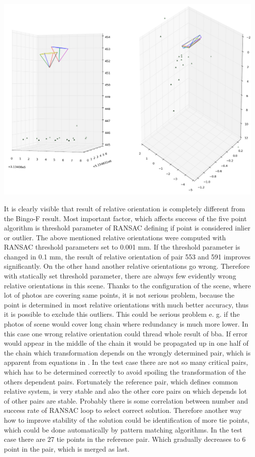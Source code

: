 \documentclass[a4paper,12pt]{article}
\begin{document}
\includegraphics[scale=0.4]{figures/rel_or_553_591.png}

It is clearly visible that result of relative orientation is completely different from the Bingo-F result.
Most important factor, which affects success of the five point algorithm is threshold parameter of RANSAC defining 
if point is considered inlier or outlier.
The above mentioned relative orientations were computed with RANSAC threshold parameters set to 0.001 mm.
If the threshold parameter is changed in 0.1 mm, the result of relative orientation of pair 553 and 591 improves significantly.
On the other hand another relative orientations go wrong. Therefore with statically set threshold parameter, there are always 
few evidently wrong relative orientations in this scene. Thanks to the configuration of the scene, where lot of photos are 
covering same points, it is  not serious problem, because the point is determined in most relative orientations  with 
much better accuracy, thus it is possible to exclude this outliers. This could be serious problem e. g. if the photos 
of scene would cover long chain where redundancy is much more lower.   
In this case one wrong relative orientation could thread whole result of bba. If error would appear in the middle 
of the chain it would  be propagated up in one half of the chain which transformation depends on the wrongly
determined pair, which is apparent from equations in \label{eq:comm_rel}. 
In the test case there are not so many critical pairs, which has to be determined correctly to avoid spoiling the transformation 
of the others dependent pairs. Fortunately the reference pair, which defines common relative system, is very stable and also 
the other  core pairs on which depends lot of other pairs are stable. 
Probably there is some correlation between number 
and success rate of RANSAC loop to select correct solution. 
Therefore another way how to improve stability of the solution 
could be identification of more tie points, which could be done automatically by pattern matching algorithms. 
In the test case there 
are 27 tie points in the reference pair. Which gradually decreases to 6 point in the pair, which is merged as last.
\end{document}
